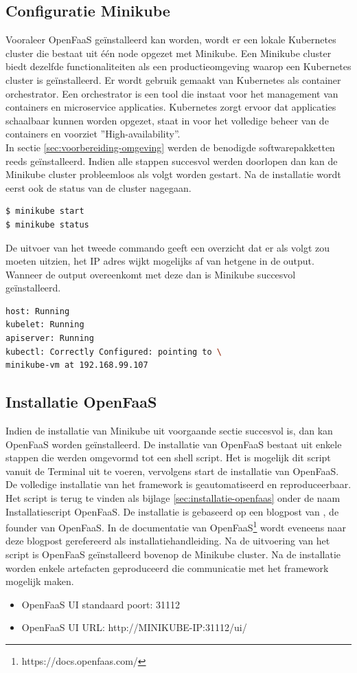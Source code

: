 \subsection{Configuratie Minikube}
Vooraleer OpenFaaS geïnstalleerd kan worden, wordt er een lokale Kubernetes cluster die bestaat uit één node opgezet met Minikube. Een Minikube cluster biedt dezelfde functionaliteiten als een productieomgeving waarop een Kubernetes cluster is geïnstalleerd. Er wordt gebruik gemaakt van Kubernetes als container orchestrator. Een orchestrator is een tool die instaat voor het management van containers en microservice applicaties. Kubernetes zorgt ervoor dat applicaties schaalbaar kunnen worden opgezet, staat in voor het volledige beheer van de containers en voorziet ''High-availability''.
\\
In sectie \ref{sec:voorbereiding-omgeving} werden de benodigde softwarepakketten reeds geïnstalleerd. Indien alle stappen succesvol werden doorlopen dan kan de Minikube cluster probleemloos als volgt worden gestart. Na de installatie wordt eerst ook de status van de cluster nagegaan.

\begin{lstlisting}[language=bash]
$ minikube start
$ minikube status
\end{lstlisting}

De uitvoer van het tweede commando geeft een overzicht dat er als volgt zou moeten uitzien, het IP adres wijkt mogelijks af van hetgene in de output. Wanneer de output overeenkomt met deze dan is Minikube succesvol geïnstalleerd.
\begin{lstlisting}[language=bash]
host: Running
kubelet: Running
apiserver: Running
kubectl: Correctly Configured: pointing to \ 
minikube-vm at 192.168.99.107
\end{lstlisting}

\subsection{Installatie OpenFaaS}
Indien de installatie van Minikube uit voorgaande sectie succesvol is, dan kan OpenFaaS worden geïnstalleerd. De installatie van OpenFaaS bestaat uit enkele stappen die werden omgevormd tot een shell script. Het is mogelijk dit script vanuit de Terminal uit te voeren, vervolgens start de installatie van OpenFaaS. De volledige installatie van het framework is geautomatiseerd en reproduceerbaar. Het script is terug te vinden als bijlage \ref{sec:installatie-openfaas} onder de naam Installatiescript OpenFaaS. De installatie is gebaseerd op een blogpost van \textcite{Ellis2017}, de founder van OpenFaaS. In de documentatie van OpenFaaS\footnote{https://docs.openfaas.com/} wordt eveneens naar deze blogpost gerefereerd als installatiehandleiding. Na de  uitvoering van het script is OpenFaaS geïnstalleerd bovenop de Minikube cluster. Na de installatie worden enkele artefacten geproduceerd die communicatie met het framework mogelijk maken.
\\
\begin{itemize}
    \item OpenFaaS UI standaard poort: 31112
    \item OpenFaaS UI URL: http://MINIKUBE-IP:31112/ui/
\end{itemize}
